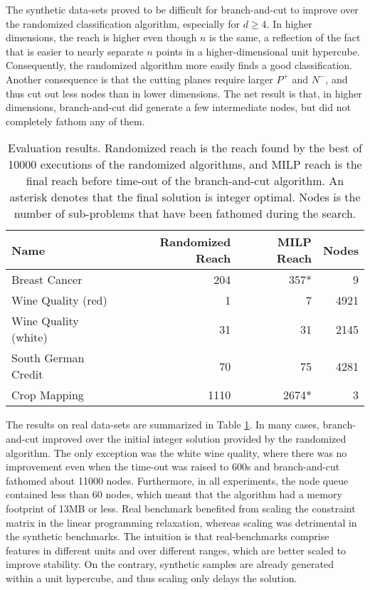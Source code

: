 \documentclass[11pt]{article}
\theoremstyle{definition}
\begin{document}
The synthetic data-sets proved to be difficult for branch-and-cut
to improve over the randomized classification algorithm,
especially for $d \geq 4$. 
In higher dimensions, the reach is higher even though $n$ is the same,
a reflection of the fact that is easier to nearly separate $n$ points 
in a higher-dimensional unit hypercube.
Consequently, the randomized algorithm more easily finds a good classification.
Another consequence is that the cutting planes require larger $P^+$ and $N^-$, and thus cut out less nodes than in lower dimensions.
The net result is that, in higher dimensions, branch-and-cut did generate a few intermediate nodes, but did not completely fathom any of them.

\begin{table}
\centering
\begin{tabular}{l|r|r|r}
{\bf Name\/} & Randomized Reach & MILP Reach & Nodes \\ \hline\hline
Breast Cancer & 204 & 357* & 9 \\ \hline 
Wine Quality (red) & 1 & 7 & 4921 \\ \hline
Wine Quality (white) & 31 & 31 & 2145 \\ \hline
South German Credit & 70 & 75 & 4281 \\ \hline
Crop Mapping & 1110 & 2674* & 3 \\ \hline
\end{tabular}
\caption{Evaluation results. 
Randomized reach is the reach found by the best of 10000
executions of the randomized algorithms,
and MILP reach is the final reach before time-out of the 
branch-and-cut algorithm.
An asterisk denotes that the final solution is integer optimal. 
Nodes is the number of sub-problems that have been fathomed during
the search.}
\label{tab:results}
\end{table}
The results on real data-sets are summarized in Table
\ref{tab:results}.
In many cases, branch-and-cut improved over the initial
integer solution provided by the randomized algorithm.
The only exception was the white wine quality, where there was no improvement
even when the time-out was raised to 600s and branch-and-cut fathomed
about 11000 nodes.
Furthermore, in all experiments, 
the node queue contained less than 60 nodes,
which meant that the algorithm had a memory footprint of 13MB or less.
Real benchmark benefited from scaling the constraint matrix in the
linear programming relaxation, whereas scaling was detrimental in
the synthetic benchmarks. 
The intuition is that real-benchmarks comprise features in 
different units and over different ranges, which are better scaled to
improve stability.
On the contrary, synthetic samples are already generated within a
unit hypercube, and thus scaling only delays the solution.
\end{document}
